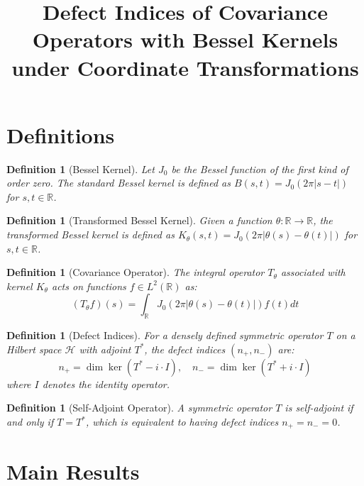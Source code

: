 \documentclass{article}
\newtheorem{definition}[theorem]{Definition}
\begin{document}
\title{Defect Indices of Covariance Operators with Bessel Kernels under Coordinate Transformations}
\author{}
\date{}
\maketitle

\section{Definitions}

\begin{definition}[Bessel Kernel]
Let $J_0$ be the Bessel function of the first kind of order zero. The standard Bessel kernel is defined as $B(s,t) = J_0(2\pi|s-t|)$ for $s,t \in \mathbb{R}$.
\end{definition}

\begin{definition}[Transformed Bessel Kernel]
Given a function $\theta: \mathbb{R} \to \mathbb{R}$, the transformed Bessel kernel is defined as $K_\theta(s,t) = J_0(2\pi|\theta(s) - \theta(t)|)$ for $s,t \in \mathbb{R}$.
\end{definition}

\begin{definition}[Covariance Operator]
The integral operator $T_\theta$ associated with kernel $K_\theta$ acts on functions $f \in L^2(\mathbb{R})$ as:
\begin{equation}
    (T_\theta f)(s) = \int_{\mathbb{R}} J_0(2\pi|\theta(s) - \theta(t)|)f(t)dt
\end{equation}
\end{definition}

\begin{definition}[Defect Indices]
For a densely defined symmetric operator $T$ on a Hilbert space $\mathcal{H}$ with adjoint $T^*$, the defect indices $(n_+, n_-)$ are:
\begin{equation}
    n_+ = \dim \ker(T^* - i\cdot I), \quad n_- = \dim \ker(T^* + i\cdot I)
\end{equation}
where $I$ denotes the identity operator.
\end{definition}

\begin{definition}[Self-Adjoint Operator]
A symmetric operator $T$ is self-adjoint if and only if $T = T^*$, which is equivalent to having defect indices $n_+ = n_- = 0$.
\end{definition}

\section{Main Results}
\end{document}
